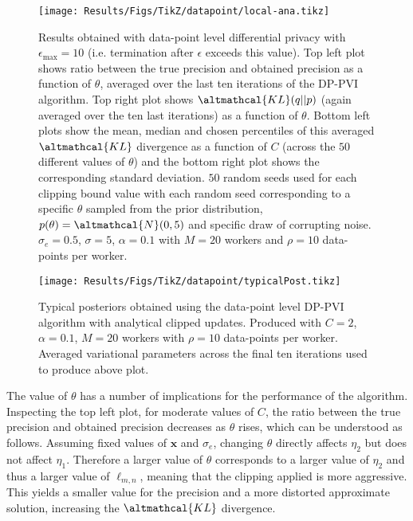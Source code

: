 \begin{figure}
	\texttt{[image: Results/Figs/TikZ/datapoint/local-ana.tikz]}
	\centering
	\caption{\label{fig:results-local-ana} Results obtained with data-point level differential privacy with $\epsilon_{\text{max}} = 10$ (i.e. termination after $\epsilon$ exceeds this value). Top left plot shows ratio between the true precision and obtained precision as a function of $\theta$, averaged over the last ten iterations of the DP-PVI algorithm. Top right plot shows $\altmathcal{KL}(q||p)$ (again averaged over the ten last iterations) as a function of $\theta$. Bottom left plots show the mean, median and chosen percentiles of this averaged $\altmathcal{KL}$ divergence as a function of $C$ (across the $50$ different values of $\theta$) and the bottom right plot shows the corresponding standard deviation. $50$ random seeds used for each clipping bound value with each random seed corresponding to a specific $\theta$ sampled from the prior distribution, $p(\theta) = \altmathcal{N}(0, 5)$ and specific draw of corrupting noise. $\sigma_e = 0.5$, $\sigma=5$, $\alpha=0.1$ with $M=20$ workers and $\rho = 10$ data-points per worker. }
\end{figure}

\begin{figure}
	\texttt{[image: Results/Figs/TikZ/datapoint/typicalPost.tikz]}
	\centering
	\caption{\label{fig:results-local-ana-post} Typical posteriors obtained using the data-point level DP-PVI algorithm with analytical clipped updates. Produced with $C=2$, $\alpha=0.1$, $M=20$ workers with $\rho = 10$ data-points per worker. Averaged variational parameters across the final ten iterations used to produce above plot. }
\end{figure}

The value of $\theta$ has a number of implications for the performance of the algorithm. Inspecting the top left plot, for moderate values of $C$, the ratio between the true precision and obtained precision decreases as $\theta$ rises, which can be understood as follows. Assuming fixed values of $\bm{x}$ and $\sigma_e$, changing $\theta$ directly affects $\eta_2$ but does not affect $\eta_1$. Therefore a larger value of $\theta$ corresponds to a larger value of $\eta_2$ and thus a larger value of $\ell_{m,n}$, meaning that the clipping applied is more aggressive. This yields a smaller value for the precision and a more distorted approximate solution, increasing the $\altmathcal{KL}$ divergence.

